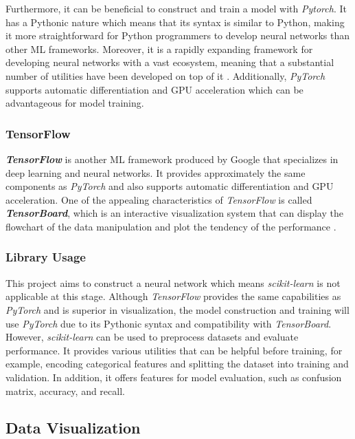 \documentclass[12pt,twoside]{report}
\begin{document}
Furthermore, it can be beneficial to construct and train a model with \textit{Pytorch}. It has a Pythonic nature which means that its syntax is similar to Python, making it more straightforward for Python programmers to develop neural networks than other ML frameworks. Moreover, it is a rapidly expanding framework for developing neural networks with a vast ecosystem, meaning that a substantial number of utilities have been developed on top of it \citep{RN5}. Additionally, \textit{PyTorch} supports automatic differentiation and GPU acceleration which can be advantageous for model training.

\subsubsection{TensorFlow}
\textit{\textbf{TensorFlow}} is another ML framework produced by Google that specializes in deep learning and neural networks. It provides approximately the same components as \textit{PyTorch} and also supports automatic differentiation and GPU acceleration. One of the appealing characteristics of \textit{TensorFlow} is called \textit{\textbf{TensorBoard}}, which is an interactive visualization system that can display the flowchart of the data manipulation and plot the tendency of the performance \citep{RN15}. 

\subsubsection{Library Usage}
This project aims to construct a neural network which means \textit{scikit-learn} is not applicable at this stage. Although \textit{TensorFlow} provides the same capabilities as \textit{PyTorch} and is superior in visualization, the model construction and training will use \textit{PyTorch} due to its Pythonic syntax and compatibility with \textit{TensorBoard}. 
\\

However, \textit{scikit-learn} can be used to preprocess datasets and evaluate performance. It provides various utilities that can be helpful before training, for example, encoding categorical features and splitting the dataset into training and validation. In addition, it offers features for model evaluation, such as confusion matrix, accuracy, and recall. 

\subsection{Data Visualization}
\end{document}
